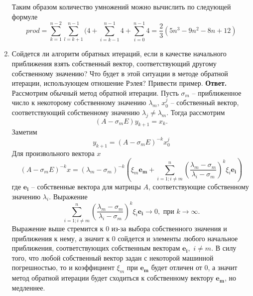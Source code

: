 \documentclass{article}
\begin{document}
\begin{enumerate}
	Таким образом количество умножений можно вычислить по следующей формуле 
	\[
	prod = \sum_{k=1}^{n-2} \sum_{l=k+1}^{n-1} (4+\sum_{i=k-1}^{n-1} 4 + \sum_{i=0}^{n-1} 4=\frac{2}{3} (5n^3-9n^2-8n+12)
	\]
        \item Сойдется ли алгоритм обратных итераций, если в качестве
        начального приближения взять собственный вектор, соответствующий
         другому собственному значению? Что будет
        в этой ситуации в методе обратной итерации, использующем
        отношение Рэлея? Привести пример.
        \newline 
        {\bfseries Ответ. } 
        Рассмотрим обычный метод обратной итерации. 
        Пусть $\sigma_m$ -- приближенное число к некоторому собственному значению $\lambda_m$,
        $x_0^j$ -- собственный вектор, соответствующий собственному значению $\lambda_j \neq \lambda_m$.
        Тогда рассмотрим
        \begin{equation*}
            (A - \sigma_m E) y_{k+1} = x_k.
        \end{equation*}
        Заметим 
        \begin{equation*}
            y_{k+1} = (A - \sigma_m E)^{-k} x^j_0
        \end{equation*}
        Для произвольного вектора $x$
        \begin{equation*}
            (A - \sigma_m E)^{-k} x = (\lambda_m - \sigma_m)^{-k} \left(
                \xi_m \boldsymbol{e_m} + \sum_{i=1; i \neq m}^{n} \left(\dfrac{\lambda_m - \sigma_m}{\lambda_i - \sigma_m}\right)^k \xi_i \boldsymbol{e_i}            
            \right)
        \end{equation*}
        где $\boldsymbol{e_i}$ -- собственные вектора для матрицы $A$, соответствующие собственному значению $\lambda_i$.
        Выражение 
        \begin{equation*}
            \sum_{i=1; i \neq m}^{n} \left(\dfrac{\lambda_m - \sigma_m}{\lambda_i - \sigma_m}\right)^k \xi_i \boldsymbol{e_i}
            \to 0, \text{ при } k \to \infty.
        \end{equation*}
        Выражение выше стремится к 0 из-за выбора собственного значения и приближения к нему, а значит 
        к 0 сойдется и элементы любого начальное приближения, соответствующих собственным векторам $\boldsymbol{e_i}, $ $ i \neq m$.
        В силу того, что любой собственный вектор задан с некоторой машинной погрешностью, то и 
        коэффициент $\xi_m$ при $\boldsymbol{e_m}$ будет отличен от 0, а значит метод обратной итерации будет сходиться к 
        собственному вектору $\boldsymbol{e_m}$, но медленнее.


\end{enumerate}
\end{document}
